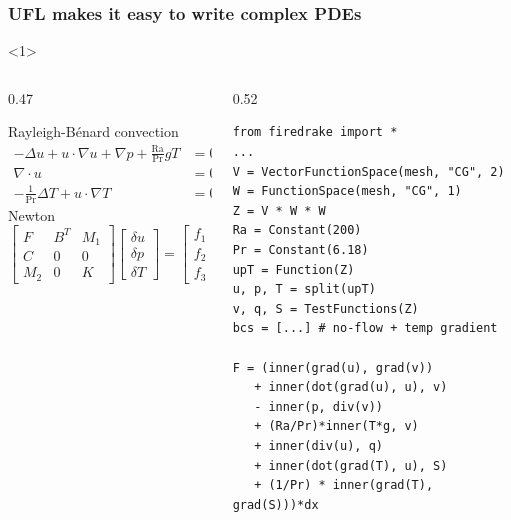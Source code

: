 \documentclass[presentation,aspectratio=43, 10pt]{beamer}
\begin{document}
\begin{frame}[fragile,t]
  \frametitle{UFL makes it easy to write complex PDEs}
  \begin{onlyenv}<1>
    \begin{columns}[T]
      \begin{column}{0.47\framewidth}
        \small
        \begin{block}{Rayleigh-B\'enard convection}
          \begin{equation*}
            \begin{split}
              -\Delta u + u\cdot\nabla u + \nabla p +
              \frac{\text{Ra}}{\text{Pr}} \hat{g}T &= 0 \\
              \nabla \cdot u &= 0 \\
              - \frac{1}{\text{Pr}} \Delta T + u\cdot \nabla T &= 0
            \end{split}
          \end{equation*}
          Newton
          \begin{equation*}
            \begin{bmatrix}
              F   & B^T & M_1 \\
              C   & 0   & 0   \\
              M_2 & 0 & K
            \end{bmatrix}
            \begin{bmatrix}
              \delta u \\
              \delta p \\
              \delta T
            \end{bmatrix} =
            \begin{bmatrix}
              f_1 \\
              f_2 \\
              f_3
            \end{bmatrix}
          \end{equation*}
        \end{block}
      \end{column}
      \begin{column}{0.52\framewidth}
\begin{verbatim}
from firedrake import *
...
V = VectorFunctionSpace(mesh, "CG", 2)
W = FunctionSpace(mesh, "CG", 1)
Z = V * W * W
Ra = Constant(200)
Pr = Constant(6.18)
upT = Function(Z)
u, p, T = split(upT)
v, q, S = TestFunctions(Z)
bcs = [...] # no-flow + temp gradient

F = (inner(grad(u), grad(v))
   + inner(dot(grad(u), u), v)
   - inner(p, div(v))
   + (Ra/Pr)*inner(T*g, v)
   + inner(div(u), q)
   + inner(dot(grad(T), u), S)
   + (1/Pr) * inner(grad(T), grad(S)))*dx


\end{verbatim}
\end{column}
\end{columns}
\end{onlyenv}
\end{frame}
\end{document}

